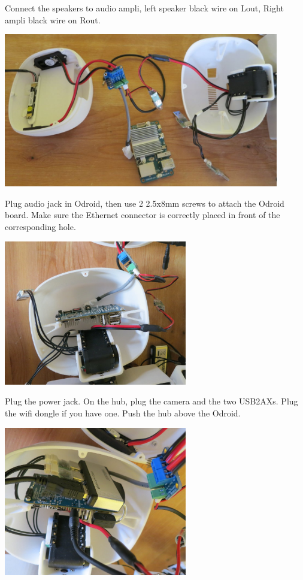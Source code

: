 \documentclass{article}
\begin{document}
Connect the speakers to audio ampli, left speaker black wire on Lout, Right ampli black wire on Rout.

 \begin{center}
  \includegraphics[width=0.9\textwidth]{img/head_wiring2}
 \end{center}

Plug audio jack in Odroid, then use 2 \diameter 2.5x8mm screws to attach the Odroid board. Make sure the Ethernet connector is correctly placed in front of the corresponding hole.

  \begin{center}
  \includegraphics[width=0.6\textwidth]{img/head_odroid}
 \end{center}

Plug the power jack. On the hub, plug the camera and the two USB2AXs. Plug the wifi dongle if you have one. Push the hub above the Odroid.

  \begin{center}
  \includegraphics[width=0.6\textwidth]{img/head_final}
 \end{center}
\end{document}
